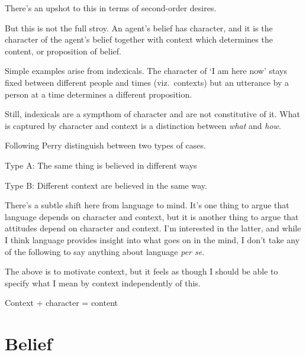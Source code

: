 \documentclass[10pt]{article}
\begin{document}
There's an upshot to this in terms of second-order desires.

But this is not the full stroy.
An agent's belief has character, and it is the character of the agent's belief together with context which determines the content, or proposition of belief.

Simple examples arise from indexicals.
The character of `I am here now' stays fixed between different people and times (viz.\ contexts) but an utterance by a person at a time determines a different proposition.

Still, indexicals are a sympthom of character and are not constitutive of it.
What is captured by character and context is a distinction between \emph{what} and \emph{how}.

Following Perry distinguish between two types of cases.

Type A: The same thing is believed in different ways

Type B: Different context are believed in the same way.

There's a subtle shift here from language to mind.
It's one thing to argue that language depends on character and context, but it is another thing to argue that attitudes depend on character and context.
I'm interested in the latter, and while I think language provides insight into what goes on in the mind, I don't take any of the following to say anything about language \emph{per se}.

The above is to motivate context, but it feels as though I should be able to specify what I mean by context independently of this.



Context + character = content


\section{Belief}
\label{sec:belief}
\end{document}
